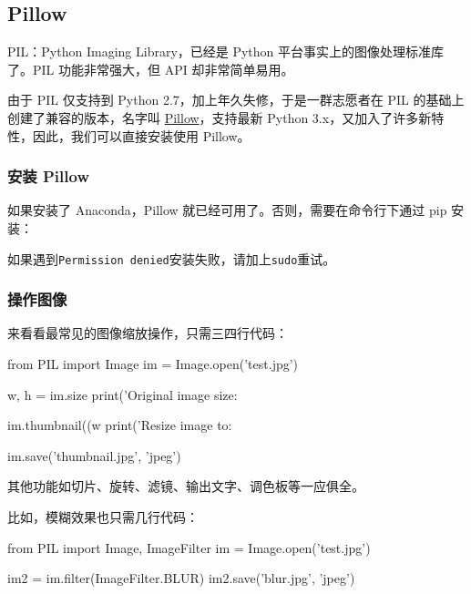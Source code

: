 \hypertarget{pillow}{%
\subsection{Pillow}\label{pillow}}

PIL：Python Imaging Library，已经是 Python
平台事实上的图像处理标准库了。PIL 功能非常强大，但 API 却非常简单易用。

由于 PIL 仅支持到 Python 2.7，加上年久失修，于是一群志愿者在 PIL
的基础上创建了兼容的版本，名字叫
\href{https://github.com/python-pillow/Pillow}{Pillow}，支持最新 Python
3.x，又加入了许多新特性，因此，我们可以直接安装使用 Pillow。

\hypertarget{ux5b89ux88c5-pillow}{%
\subsubsection{安装 Pillow}\label{ux5b89ux88c5-pillow}}

如果安装了 Anaconda，Pillow 就已经可用了。否则，需要在命令行下通过 pip
安装：


如果遇到\texttt{Permission\ denied}安装失败，请加上\texttt{sudo}重试。

\hypertarget{ux64cdux4f5cux56feux50cf}{%
\subsubsection{操作图像}\label{ux64cdux4f5cux56feux50cf}}

来看看最常见的图像缩放操作，只需三四行代码：

\begin{pythoncode}
from PIL import Image
im = Image.open('test.jpg')

w, h = im.size
print('Original image size: %

im.thumbnail((w
print('Resize image to: %

im.save('thumbnail.jpg', 'jpeg')
\end{pythoncode}

其他功能如切片、旋转、滤镜、输出文字、调色板等一应俱全。

比如，模糊效果也只需几行代码：

\begin{pythoncode}
from PIL import Image, ImageFilter
im = Image.open('test.jpg')

im2 = im.filter(ImageFilter.BLUR)
im2.save('blur.jpg', 'jpeg')
\end{pythoncode}

